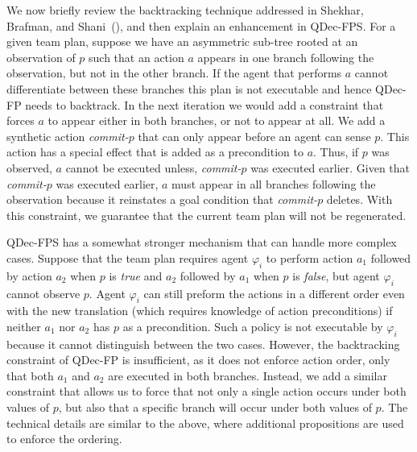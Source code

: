 \documentclass[letterpaper]{article} %
\theoremstyle{definition}
\begin{document}
{We now briefly review the backtracking technique addressed in Shekhar, Brafman, and Shani~(\citeyear{ShekharBS19}), and then explain an enhancement in QDec-FPS.
For a given team plan, suppose we have an asymmetric sub-tree rooted at an observation of $p$ such that an action $a$ appears in one branch following the observation, but not in the other branch.  If the agent that performs $a$ cannot differentiate between these branches
this plan is not executable and hence QDec-FP needs to backtrack. 
In the next iteration we would add a constraint that forces $a$ to appear either in both branches, or not to appear at all. 
We add a synthetic action {\em commit-$p$} that can only appear before an agent can sense $p$. 
This action has a special effect that is added as a precondition to $a$. 
Thus, if $p$ was observed, $a$ cannot be executed unless, {\em commit-$p$} was executed earlier.  Given
that {\em commit-$p$} was executed earlier,  $a$ must appear in all branches following the observation because
it reinstates a goal condition that {\em commit-$p$} deletes.
With this constraint, we guarantee that the current team plan will not be regenerated.

QDec-FPS has a somewhat stronger mechanism that can handle more complex cases. 
Suppose that the team plan requires agent $\varphi_i$ to perform action $a_1$ followed by action $a_2$ when $p$ is {\em true} and $a_2$ followed by $a_1$ when $p$ is {\em false}, but agent $\varphi_i$ cannot observe $p$. 
Agent $\varphi_i$ can still preform the actions in a different order even with the new translation (which requires knowledge of action preconditions) if neither $a_1$ nor $a_2$ has $p$ as a precondition. 
Such a policy is not executable by $\varphi_i$ because it cannot distinguish between the two cases. 
However, the backtracking constraint of QDec-FP is insufficient, as it does not enforce action order, only that both $a_1$ and $a_2$ are executed in both branches. 
Instead, we add a similar constraint that allows us to force that not only a single action occurs under both values of $p$, but also that a specific branch will occur under both values of $p$. 
The technical details are similar to the above, where additional propositions are used to enforce the ordering.
}
%
\end{document}
